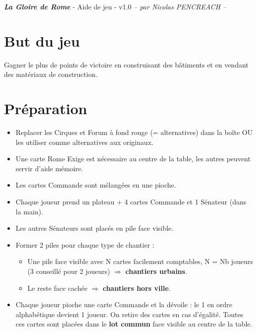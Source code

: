\documentclass[10pt, a4paper]{article}	%
\begin{document}
{\LARGE \textbf{\textit{La Gloire de Rome}}}
{\large - Aide de jeu - v1.0}\textit{ -- par Nicolas PENCREACH --}

\setlength{\columnseprule}{0.002cm}	%
\begin{multicols}{3}				%


\section{But du jeu}
Gagner le plus de points de victoire en construisant des bâtiments et en vendant des matériaux de construction.



\section{Préparation}
\begin{itemize}
\item Replacer les Cirques et Forum à fond rouge (= alternatives) dans la boîte OU les utiliser comme alternatives aux originaux.
\item Une carte \og Rome Exige\fg{} est nécessaire au centre de la table, les autres peuvent servir d'aide mémoire.
\item Les cartes Commande sont mélangées en une pioche.
\item Chaque joueur prend un plateau + 4 cartes Commande et 1 Sénateur (dans la main).
\item Les autres Sénateurs sont placés en pile face visible.
\item Former 2 piles pour chaque type de chantier :
	\begin{itemize}
	\item Une pile face visible avec N cartes facilement comptables, N = Nb joueurs (3 conseillé pour 2 joueurs) $\Rightarrow$ \textbf{chantiers urbains}.
	\item Le reste face cachée $\Rightarrow$ \textbf{chantiers hors ville}.
	\end{itemize}
\item Chaque joueur pioche une carte Commande et la dévoile : le 1\ier{} en ordre alphabétique devient 1\ier{} joueur. On retire des cartes en cas d'égalité. Toutes ces cartes sont placées dans le \textbf{lot commun} face visible au centre de la table.
\end{itemize}




\end{multicols}
\end{document}
